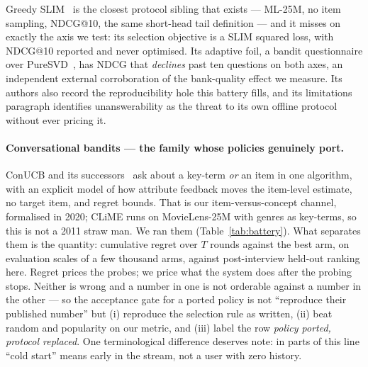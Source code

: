 \documentclass[11pt]{article}
\begin{document}
Greedy SLIM~\cite{proissl2024greedyslim} is the closest protocol sibling that exists --- ML-25M,
no item sampling, NDCG@10, the same short-head tail definition --- and it misses on exactly the axis
we test: its selection objective is a SLIM squared loss, with NDCG@10 reported and never optimised.
Its adaptive foil, a bandit questionnaire over PureSVD~\cite{christakopoulou2016towards}, has NDCG
that \emph{declines} past ten questions on both axes, an independent external corroboration of the
bank-quality effect we measure. Its authors also record the reproducibility hole this battery fills,
and its limitations paragraph identifies unanswerability as the threat to its own offline protocol
without ever pricing it.

\paragraph{Conversational bandits --- the family whose policies genuinely port.} ConUCB and its
successors~\cite{zhang2020conucb,wang2023conlinucb,liu2025clisk} ask about a key-term \emph{or} an
item in one algorithm, with an explicit model of how attribute feedback moves the item-level
estimate, no target item, and regret bounds. That is our item-versus-concept channel, formalised in
2020; CLiME runs on MovieLens-25M with genres as key-terms, so this is not a 2011 straw man. We ran
them (Table~\ref{tab:battery}). What separates them is the quantity: cumulative regret over $T$
rounds against the best arm, on evaluation scales of a few thousand arms, against post-interview
held-out ranking here. Regret prices the probes; we price what the system does after the probing
stops. Neither is wrong and a number in one is not orderable against a number in the other --- so the
acceptance gate for a ported policy is not ``reproduce their published number'' but (i) reproduce the
selection rule as written, (ii) beat random and popularity on our metric, and (iii) label the row
\emph{policy ported, protocol replaced}. One terminological difference deserves note: in parts of this line ``cold start'' means early in
the stream, not a user with zero history.
\end{document}
